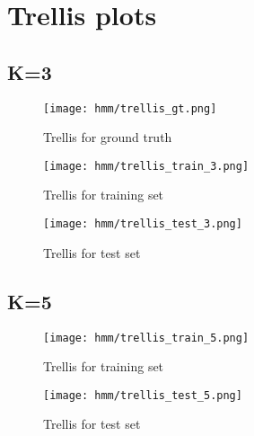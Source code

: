 \documentclass[12pt,a4paper]{article}
\begin{document}
\section{Trellis plots}

\subsection{K=3}

\begin{figure}[H]
  \centering
  \texttt{[image: hmm/trellis\_gt.png]}
  \caption{Trellis for ground truth}  
\end{figure}

\begin{figure}[H]
  \centering
  \texttt{[image: hmm/trellis\_train\_3.png]}
  \caption{Trellis for training set}  
\end{figure}

\begin{figure}[H]
  \centering
  \texttt{[image: hmm/trellis\_test\_3.png]}
  \caption{Trellis for test set}  
\end{figure}

\subsection{K=5}

\begin{figure}[H]
  \centering
  \texttt{[image: hmm/trellis\_train\_5.png]}
  \caption{Trellis for training set}  
\end{figure}

\begin{figure}[H]
  \centering
  \texttt{[image: hmm/trellis\_test\_5.png]}
  \caption{Trellis for test set}  
\end{figure}
\end{document}
